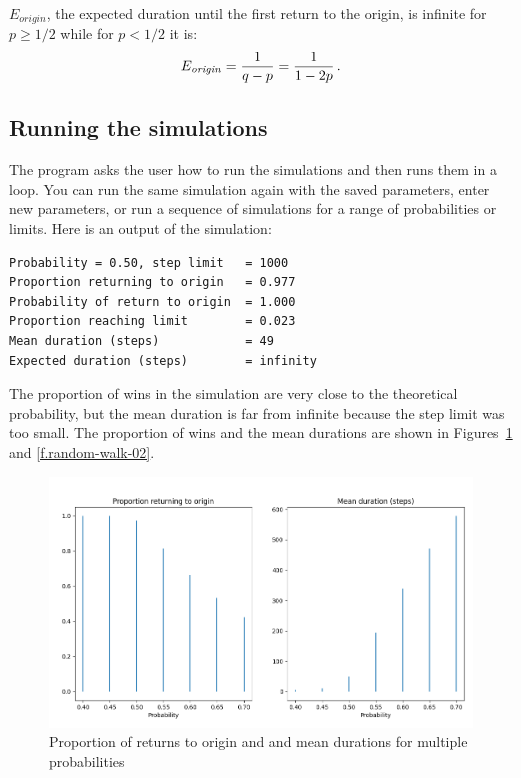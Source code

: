 $E_{\mathit{origin}}$, the expected duration until the first return to the origin, is infinite for $p\geq 1/2$ while for $p<1/2$ it is:
\[
E_{\mathit{origin}}=\displaystyle\frac{1}{q-p}=\displaystyle\frac{1}{1-2p}\,.
\]

\subsection{Running the simulations}

The program asks the user how to run the simulations and then runs them in a loop. You can run the same simulation again with the saved parameters, enter new parameters, or run a sequence of simulations for a range of probabilities or limits. Here is an output of the simulation:
\begin{verbatim}
Probability = 0.50, step limit   = 1000
Proportion returning to origin   = 0.977
Probability of return to origin  = 1.000
Proportion reaching limit        = 0.023
Mean duration (steps)            = 49
Expected duration (steps)        = infinity
\end{verbatim}
The proportion of wins in the simulation are very close to the theoretical probability, but the mean duration is far from infinite because the step limit was too small.  The proportion of wins and the mean durations are shown in Figures~\ref{f.random-walk-01} and \ref{f.random-walk-02}.
\begin{figure}
\begin{center}
\includegraphics[width=\textwidth]{random-walk-01}
\caption{Proportion of returns to origin and and mean durations for multiple probabilities}\label{f.random-walk-01}
\end{center}
\end{figure}
